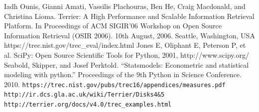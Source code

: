 \documentclass[letterpaper, 10 pt, conference]{ieeeconf}  %
\begin{document}






\begin{thebibliography}{99}
 Iadh Ounis, Gianni Amati, Vassilis Plachouras, Ben He, Craig Macdonald, and Christina Lioma. Terrier: A High Performance and Scalable Information Retrieval Platform. In Proceedings of ACM SIGIR'06 Workshop on Open Source Information Retrieval (OSIR 2006). 10th August, 2006. Seattle, Washington, USA
 https://trec.nist.gov/trec\_eval/index.html
 Jones E, Oliphant E, Peterson P, et al. SciPy: Open Source Scientific Tools for Python, 2001, http://www.scipy.org/ 
 Seabold, Skipper, and Josef Perktold. “Statsmodels: Econometric and statistical modeling with python.” Proceedings of the 9th Python in Science Conference. 2010.
 \texttt{https://trec.nist.gov/pubs/trec16/appendices/measures.pdf}
 \texttt{http://ir.dcs.gla.ac.uk/wiki/Terrier/Disks4\&5}
 \texttt{http://terrier.org/docs/v4.0/trec\_examples.html}
\end{thebibliography}
\end{document}
